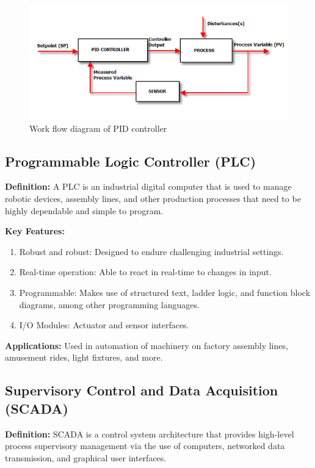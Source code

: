 \begin{figure}[h!]
  \centering
  \includegraphics[width=0.8\linewidth]{figs/control_instrumentation/image8.png}
  \caption{Work flow diagram of PID controller}
  \label{fig:Work flow diagram of PID controller}
\end{figure}

\subsection{Programmable Logic Controller (PLC)}

\textbf{Definition:} A PLC is an industrial digital computer that is
used to manage robotic devices, assembly lines, and other production
processes that need to be highly dependable and simple to program.

\textbf{Key Features:}

\begin{enumerate}
\item
  Robust and robust: Designed to endure challenging industrial settings.
\item
  Real-time operation: Able to react in real-time to changes in input.
\item
  Programmable: Makes use of structured text, ladder logic, and function
  block diagrams, among other programming languages.
\item
  I/O Modules: Actuator and sensor interfaces.
\end{enumerate}

\textbf{Applications:} Used in automation of machinery on factory
assembly lines, amusement rides, light fixtures, and more.




\subsection{Supervisory Control and Data Acquisition (SCADA)}

\textbf{Definition:} SCADA is a control system architecture that
provides high-level process supervisory management via the use of
computers, networked data transmission, and graphical user interfaces.

